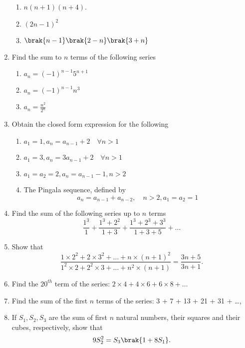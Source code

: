 \begin{enumerate}[label=\thesubsection.\arabic*,ref=\thesubsection.\theenumi]
\begin{multicols}{2}
\begin{enumerate}[itemsep=1ex]
\item $n (n+1) (n+4)$.
\item $(2 n - 1)^2$
\item $\brak{n-1}\brak{2-n}\brak{3+n}$
\end{enumerate}
\end{multicols}
\item Find the sum to $n$ terms of the following series
\begin{enumerate}
\item $a_n = (-1)^{n-1}5^{n+1}$
\item $a_n = (-1)^{n-1}n^3$
\item $a_n = \frac{n^2}{2^n}$
\end{enumerate}
\item Obtain the closed form expression for the following
\begin{enumerate}
\item $a_1 = 1, a_n = a_{n-1}+2 \quad \forall n > 1$
\item $a_1 = 3, a_n = 3a_{n-1}+2 \quad \forall n > 1$
\item $a_1 = a_2 = 2, a_n = a_{n-1}-1, n > 2$ 
\item The Pingala sequence, defined by $$a_n = a_{n-1}+a_{n-2}, \quad n>2,  a_1 = a_2=1$$ 
\end{enumerate}
\item Find the sum of the following series up to $n$ terms
$$\frac{1^3}{1}+\frac{1^3+2^2}{1+3}+\frac{1^3+2^3+3^3}{1+3+5}+\dots$$
\item Show that $$\frac{1 \times 2^2+ 2 \times 3^2+\dots+n \times (n+1)^2}{1^2 \times 2 + 2^2 \times 3 +\dots+n^2 \times (n+1)} = \frac{3n+5}{3n+1}.$$
\item Find the $20^{th}$ term of the series: $2 \times 4 + 4 \times 6 + 6 \times 8 + \dots  $ 
\item Find the sum of the first $n$ terms of the series: 3 + 7 + 13 + 21 + 31 + \dots, 
\item If $S_1, S_2, S_3$ are the sum of first $n$ natural numbers, their squares and their cubes, respectively, show that $$9 S_2^2 = S_3 \brak{1 + 8S_1}.$$
\end{enumerate}
